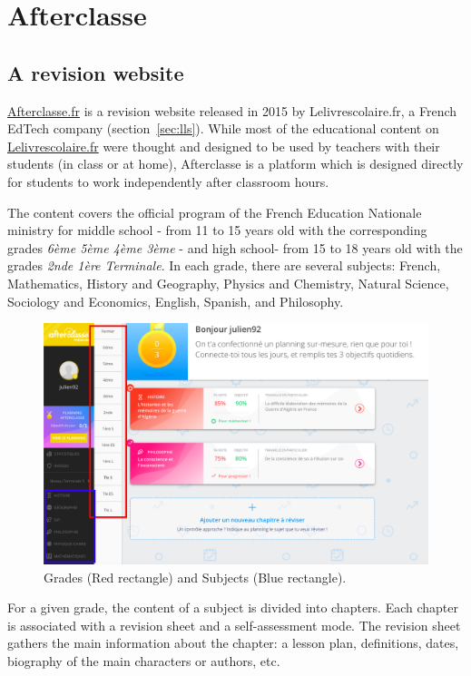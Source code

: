 \chapter{Afterclasse}
\label{ch:afterclasse}
\section{A revision website}
\href{https://www.afterclasse.fr}{Afterclasse.fr} is a revision website released in 2015 by Lelivrescolaire.fr, a French EdTech company (section~\ref{sec:lls}). While most of the educational content on \href{https://www.lelivrescolaire.fr}{Lelivrescolaire.fr} were thought and designed to be used by teachers with their students (in class or at home), Afterclasse is a platform which is designed directly for students to work independently after classroom hours. 

The content covers the official program of the French Education Nationale ministry for middle school - from 11 to 15 years old with the corresponding grades \emph{6ème 5ème 4ème 3ème} - and high school- from 15 to 18 years old with the grades \emph{2nde 1ère Terminale}. In each grade, there are several subjects: French, Mathematics, History and Geography, Physics and Chemistry, Natural Science, Sociology and Economics, English, Spanish, and Philosophy. 

\begin{figure}[!ht]
\centering
\includegraphics[clip, width= \textwidth]{1literature/fig/afterclasse.png}
\caption{Grades (Red rectangle) and Subjects (Blue rectangle). }
\label{fig:afterclasse}
\end{figure}

For a given grade, the content of a subject is divided into chapters.  Each chapter is associated with a revision sheet and a self-assessment mode. The revision sheet gathers the main information about the chapter: a lesson plan, definitions, dates, biography of the main characters or authors, etc.

